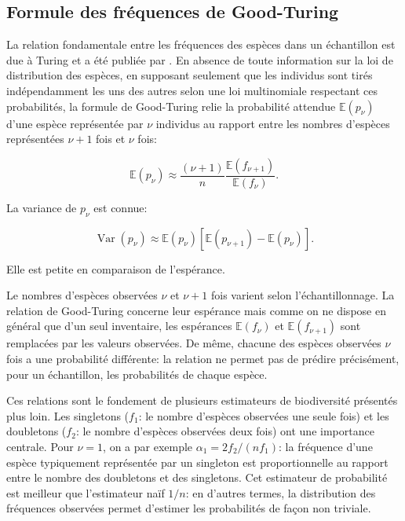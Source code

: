\documentclass[
  11pt,
  american,
  a4paper,
  extrafontsizes,onecolumn,openright
  ]{memoir}
\begin{document}
\hypertarget{formule-des-fruxe9quences-de-good-turing}{%
\subsection{Formule des fréquences de Good-Turing}\label{formule-des-fruxe9quences-de-good-turing}}

La relation fondamentale entre les fréquences des espèces dans un échantillon est due à Turing et a été publiée par \textcite{Good1953}.
En absence de toute information sur la loi de distribution des espèces, en supposant seulement que les individus sont tirés indépendamment les uns des autres selon une loi multinomiale respectant ces probabilités, la formule de Good-Turing relie la probabilité attendue \({\mathbb E}(p_\nu)\) d'une espèce représentée par \(\nu\) individus au rapport entre les nombres d'espèces représentées \(\nu+1\) fois et \(\nu\) fois:

\begin{equation}
  \label{eq:alphanu}
  {\mathbb E}\left( p_\nu \right) 
  \approx \frac{(\nu + 1)}{n} \frac{{\mathbb E}\left( f_{\nu+1} \right)}{{\mathbb E}\left( f_\nu \right)}.
\end{equation}

La variance de \(p_\nu\) est connue:

\begin{equation}
  \label{eq:varpnu}
  \operatorname{Var}\left( p_\nu \right) 
  \approx {\mathbb E}\left( p_\nu \right) \left[ {\mathbb E}\left( p_{\nu + 1} \right) - {\mathbb E}\left( p_\nu \right) \right].
\end{equation}

Elle est petite en comparaison de l'espérance.

Le nombres d'espèces observées \(\nu\) et \(\nu + 1\) fois varient selon l'échantillonnage.
La relation de Good-Turing concerne leur espérance mais comme on ne dispose en général que d'un seul inventaire, les espérances \({\mathbb E}(f_\nu)\) et \({\mathbb E}(f_{\nu + 1})\) sont remplacées par les valeurs observées.
De même, chacune des espèces observées \(\nu\) fois a une probabilité différente: la relation ne permet pas de prédire précisément, pour un échantillon, les probabilités de chaque espèce.

Ces relations sont le fondement de plusieurs estimateurs de biodiversité présentés plus loin.
Les singletons (\(f_{1}\): le nombre d'espèces observées une seule fois) et les doubletons (\(f_{2}\): le nombre d'espèces observées deux fois) ont une importance centrale.
Pour \(\nu=1\), on a par exemple \(\alpha_1 = 2 f_{2}/(nf_{1})\): la fréquence d'une espèce typiquement représentée par un singleton est proportionnelle au rapport entre le nombre des doubletons et des singletons.
Cet estimateur de probabilité est meilleur que l'estimateur naïf \(1/n\): en d'autres termes, la distribution des fréquences observées permet d'estimer les probabilités de façon non triviale.
\end{document}
